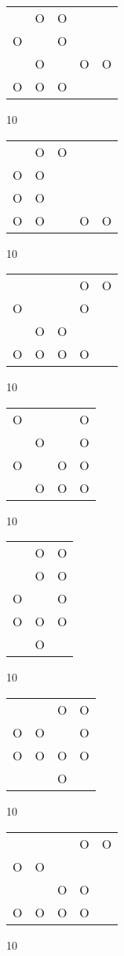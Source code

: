 \begin{tabular}{|m{0.2cm}m{0.2cm}m{0.2cm}m{0.2cm}m{0.2cm}|}\hline
 &O&O& & \\
O& &O& & \\
 &O& &O&O\\
O&O&O& & \\
\hline\end{tabular}10
\begin{tabular}{|m{0.2cm}m{0.2cm}m{0.2cm}m{0.2cm}m{0.2cm}|}\hline
 &O&O& & \\
O&O& & & \\
O&O& & & \\
O&O& &O&O\\
\hline\end{tabular}10
\begin{tabular}{|m{0.2cm}m{0.2cm}m{0.2cm}m{0.2cm}m{0.2cm}|}\hline
 & & &O&O\\
O& & &O& \\
 &O&O& & \\
O&O&O&O& \\
\hline\end{tabular}10
\begin{tabular}{|m{0.2cm}m{0.2cm}m{0.2cm}m{0.2cm}|}\hline
O& & &O\\
 &O& &O\\
O& &O&O\\
 &O&O&O\\
\hline\end{tabular}10
\begin{tabular}{|m{0.2cm}m{0.2cm}m{0.2cm}|}\hline
 &O&O\\
 &O&O\\
O& &O\\
O&O&O\\
 &O& \\
\hline\end{tabular}10
\begin{tabular}{|m{0.2cm}m{0.2cm}m{0.2cm}m{0.2cm}|}\hline
 & &O&O\\
O&O& &O\\
O&O&O&O\\
 & &O& \\
\hline\end{tabular}10
\begin{tabular}{|m{0.2cm}m{0.2cm}m{0.2cm}m{0.2cm}m{0.2cm}|}\hline
 & & &O&O\\
O&O& & & \\
 & &O&O& \\
O&O&O&O& \\
\hline\end{tabular}10
